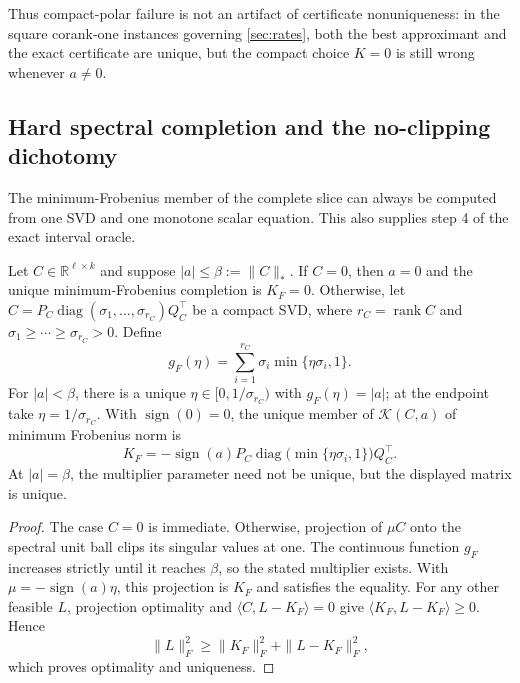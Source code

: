 Thus compact-polar failure is not an artifact of certificate nonuniqueness:
in the square corank-one instances governing \cref{sec:rates}, both the
best approximant and the exact certificate are unique, but the compact choice
\(K=0\) is still wrong whenever \(a\ne0\).

\subsection{Hard spectral completion and the no-clipping dichotomy}

The minimum-Frobenius member of the complete slice can always be computed from
one SVD and one monotone scalar equation.  This also supplies step 4 of the
exact interval oracle.

\begin{theorem}
\label{thm:frobenius-water-filling}
Let \(C\in\mathbb R^{\ell\times k}\) and suppose
\(|a|\le\beta:=\|C\|_*\).  If \(C=0\), then \(a=0\) and the unique
minimum-Frobenius completion is \(K_F=0\).  Otherwise, let
\(C=P_C\operatorname{diag}(\sigma_1,\ldots,\sigma_{r_C})Q_C^\top\) be a compact
SVD, where \(r_C=\operatorname{rank}C\) and
\(\sigma_1\ge\cdots\ge\sigma_{r_C}>0\).  Define
\[
 g_F(\eta)=\sum_{i=1}^{r_C}\sigma_i\min\{\eta\sigma_i,1\}.
\]
For \(|a|<\beta\), there is a unique
\(\eta\in[0,1/\sigma_{r_C})\) with \(g_F(\eta)=|a|\); at the endpoint take
\(\eta=1/\sigma_{r_C}\).  With \(\operatorname{sign}(0)=0\), the unique member of
\(\mathcal K(C,a)\) of minimum Frobenius norm is
\begin{equation}
 K_F=-\operatorname{sign}(a)P_C
 \operatorname{diag}\bigl(\min\{\eta\sigma_i,1\}\bigr)Q_C^\top.
 \label{eq:KF-main}
\end{equation}
At \(|a|=\beta\), the multiplier parameter need not be unique, but the
displayed matrix is unique.
\end{theorem}

\begin{proof}
The case \(C=0\) is immediate.  Otherwise, projection of \(\mu C\) onto the spectral unit ball clips its singular values
at one.  The continuous function \(g_F\) increases strictly until it reaches
\(\beta\), so the stated multiplier exists.  With
\(\mu=-\operatorname{sign}(a)\eta\), this projection is \(K_F\) and satisfies
the equality.  For any other feasible \(L\), projection optimality and
\(\langle C,L-K_F\rangle=0\) give
\(\langle K_F,L-K_F\rangle\ge0\).  Hence
\[
 \|L\|_F^2\ge\|K_F\|_F^2+\|L-K_F\|_F^2,
\]
which proves optimality and uniqueness.
\end{proof}

